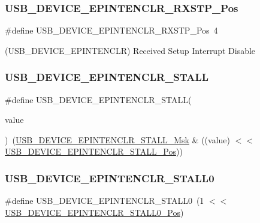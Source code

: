 \subsubsection{\texorpdfstring{USB\_DEVICE\_EPINTENCLR\_RXSTP\_Pos}{USB\_DEVICE\_EPINTENCLR\_RXSTP\_Pos}}
{\footnotesize\ttfamily \#define U\+S\+B\+\_\+\+D\+E\+V\+I\+C\+E\+\_\+\+E\+P\+I\+N\+T\+E\+N\+C\+L\+R\+\_\+\+R\+X\+S\+T\+P\+\_\+\+Pos~4}



(U\+S\+B\+\_\+\+D\+E\+V\+I\+C\+E\+\_\+\+E\+P\+I\+N\+T\+E\+N\+C\+LR) Received Setup Interrupt Disable 

\mbox{\label{group___s_a_m_d21___u_s_b_ga5dabf4d55682115d290c2781f31d0760}} 
\subsubsection{\texorpdfstring{USB\_DEVICE\_EPINTENCLR\_STALL}{USB\_DEVICE\_EPINTENCLR\_STALL}}
{\footnotesize\ttfamily \#define U\+S\+B\+\_\+\+D\+E\+V\+I\+C\+E\+\_\+\+E\+P\+I\+N\+T\+E\+N\+C\+L\+R\+\_\+\+S\+T\+A\+LL(\begin{DoxyParamCaption}\item[{}]{value }\end{DoxyParamCaption})~(\mbox{\hyperlink{group___s_a_m_d21___u_s_b_ga12611d5c3f417b9b83f0e13bc1d3e43a}{U\+S\+B\+\_\+\+D\+E\+V\+I\+C\+E\+\_\+\+E\+P\+I\+N\+T\+E\+N\+C\+L\+R\+\_\+\+S\+T\+A\+L\+L\+\_\+\+Msk}} \& ((value) $<$$<$ \mbox{\hyperlink{group___s_a_m_d21___u_s_b_ga35b6164a256415dc81652aa38f381584}{U\+S\+B\+\_\+\+D\+E\+V\+I\+C\+E\+\_\+\+E\+P\+I\+N\+T\+E\+N\+C\+L\+R\+\_\+\+S\+T\+A\+L\+L\+\_\+\+Pos}}))}

\mbox{\label{group___s_a_m_d21___u_s_b_ga4b52eb747f38e2963c64e8f743500221}} 
\subsubsection{\texorpdfstring{USB\_DEVICE\_EPINTENCLR\_STALL0}{USB\_DEVICE\_EPINTENCLR\_STALL0}}
{\footnotesize\ttfamily \#define U\+S\+B\+\_\+\+D\+E\+V\+I\+C\+E\+\_\+\+E\+P\+I\+N\+T\+E\+N\+C\+L\+R\+\_\+\+S\+T\+A\+L\+L0~(1 $<$$<$ \mbox{\hyperlink{group___s_a_m_d21___u_s_b_ga6903cb46049f609160a165ef1c9565e3}{U\+S\+B\+\_\+\+D\+E\+V\+I\+C\+E\+\_\+\+E\+P\+I\+N\+T\+E\+N\+C\+L\+R\+\_\+\+S\+T\+A\+L\+L0\+\_\+\+Pos}})}

